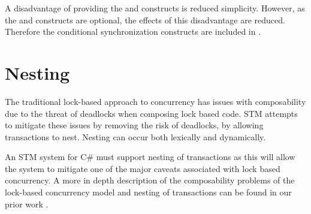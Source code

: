 A disadvantage of providing the  and  constructs is reduced simplicity. However, as the  and  constructs are optional, the effects of this disadvantage are reduced. Therefore the conditional synchronization constructs are included in \stmname.

\section{Nesting}
\label{sec:stm_req_nesting}
The traditional lock-based approach to concurrency has issues with composability due to the threat of deadlocks when composing lock based code\cite[p. 58]{sutter2005software}. \ac{STM} attempts to mitigate these issues by removing the risk of deadlocks, by allowing transactions to nest. Nesting can occur both lexically and dynamically\cite[p. 1]{kumar2011hparstm}\cite[p. 42]{harris2010transactional}\cite[p. 2081]{herlihy2011tm}.

%
%
%      
%
%
%      

An \ac{STM} system for C\# must support nesting of transactions as this will allow the system to mitigate one of the major caveats associated with lock based concurrency. A more in depth description of the composability problems of the lock-based concurrency model and nesting of transactions can be found in our prior work \cite{dpt907e14trending}.

